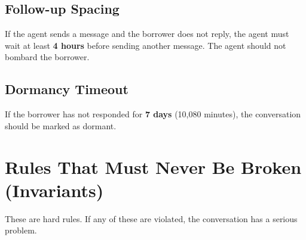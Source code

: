 \documentclass[11pt, a4paper]{article}
\begin{document}
\subsection{Follow-up Spacing}

If the agent sends a message and the borrower does not reply, the agent must wait at least \textbf{4 hours} before sending another message. The agent should not bombard the borrower.

\subsection{Dormancy Timeout}

If the borrower has not responded for \textbf{7 days} (10,080 minutes), the conversation should be marked as dormant.

\section{Rules That Must Never Be Broken (Invariants)}
\label{sec:invariants}

These are hard rules. If any of these are violated, the conversation has a serious problem.
\end{document}
